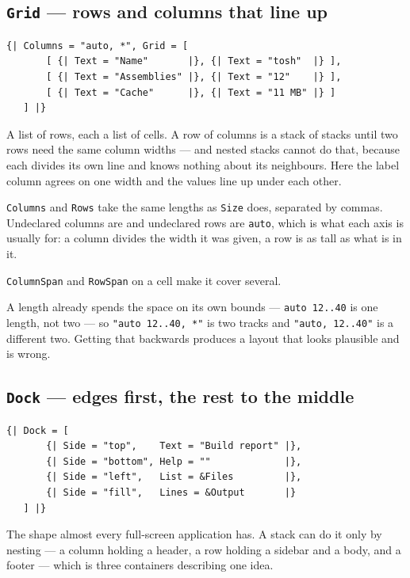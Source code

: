 \documentclass[11pt,a4paper,twoside,openany]{book}
\newcommand{\code}[1]{\texttt{\small #1}}
\begin{document}
\subsection{\texttt{Grid} --- rows and columns that line up}

\begin{lstlisting}
{| Columns = "auto, *", Grid = [
       [ {| Text = "Name"       |}, {| Text = "tosh"  |} ],
       [ {| Text = "Assemblies" |}, {| Text = "12"    |} ],
       [ {| Text = "Cache"      |}, {| Text = "11 MB" |} ]
   ] |}
\end{lstlisting}

A list of rows, each a list of cells. A row of columns is a stack of stacks until two
rows need the same column widths --- and nested stacks cannot do that, because each
divides its own line and knows nothing about its neighbours. Here the label column
agrees on one width and the values line up under each other.

\code{Columns} and \code{Rows} take the same lengths as \code{Size} does, separated
by commas. Undeclared columns are \code{*} and undeclared rows are \code{auto}, which
is what each axis is usually for: a column divides the width it was given, a row is as
tall as what is in it.

\code{ColumnSpan} and \code{RowSpan} on a cell make it cover several.

\begin{warnbox}
A length already spends the space on its own bounds --- \code{auto 12..40} is one
length, not two --- so \code{"auto 12..40, *"} is two tracks and
\code{"auto, 12..40"} is a different two. Getting that backwards produces a layout
that looks plausible and is wrong.
\end{warnbox}

\subsection{\texttt{Dock} --- edges first, the rest to the middle}

\begin{lstlisting}
{| Dock = [
       {| Side = "top",    Text = "Build report" |},
       {| Side = "bottom", Help = ""             |},
       {| Side = "left",   List = &Files         |},
       {| Side = "fill",   Lines = &Output       |}
   ] |}
\end{lstlisting}

The shape almost every full-screen application has. A stack can do it only by nesting
--- a column holding a header, a row holding a sidebar and a body, and a footer ---
which is three containers describing one idea.
\end{document}
